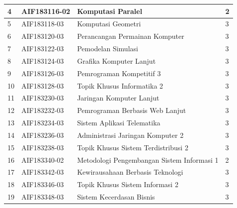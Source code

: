 \documentclass[a4paper,twoside]{article}
\begin{document}
\begin{enumerate}
\begin{enumerate}
\begin{table}[H]
\begin{tabular}{|p{0.5cm}|p{2.85cm}|p{4.95cm}|p{2.7cm}|}
4   & AIF183116-02    & Komputasi Paralel                          & 2   \\ \hline
5   & AIF183118-03    & Komputasi Geometri                         & 3   \\ \hline
6   & AIF183120-03    & Perancangan Permainan Komputer             & 3   \\ \hline
7   & AIF183122-03    & Pemodelan Simulasi                         & 3   \\ \hline
8   & AIF183124-03    & Grafika Komputer Lanjut                    & 3   \\ \hline
9   & AIF183126-03    & Pemrograman Kompetitif 3                   & 3   \\ \hline
10  & AIF183128-03    & Topik Khusus Informatika 2                 & 3   \\ \hline
11  & AIF183230-03    & Jaringan Komputer Lanjut                   & 3   \\ \hline
12  & AIF183232-03    & Pemrograman Berbasis Web Lanjut            & 3   \\ \hline
13  & AIF183234-03    & Sistem Aplikasi Telematika                 & 3   \\ \hline
14  & AIF183236-03    & Administrasi Jaringan Komputer 2           & 3   \\ \hline
15  & AIF183238-03    & Topik Khusus Sistem Terdistribusi 2        & 3   \\ \hline
16  & AIF183340-02    & Metodologi Pengembangan Sistem Informasi 1 & 2   \\ \hline
17  & AIF183342-03    & Kewirausahaan Berbasis Teknologi           & 3   \\ \hline
18 & AIF183346-03    & Topik Khusus Sistem Informasi 2            & 3   \\ \hline
19  & AIF183348-03    & Sistem Kecerdasan Bisnis                   & 3   \\ \hline
		\end{tabular}
	\label{tab:kuliahpilihan_2}
\end{table}


\end{enumerate}
\end{enumerate}
\end{document}
